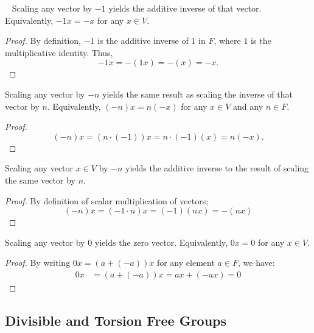 \begin{claim}~\label{claim:scale-neg-1}
  Scaling any vector by $-1$ yields the additive inverse of that vector.
  Equivalently, $-1 x = -x$ for any $x \in V$.

  \begin{proof}
    By definition, $-1$ is the additive inverse of $1$ in $F$,
    where $1$ is the multiplicative identity.
    Thus, \[ -1 x = -(1 x) = -(x) = -x. \]
  \end{proof}

  \begin{corollary}
    Scaling any vector by $-n$ yields the same result as scaling the inverse
    of that vector by $n$.
    Equivalently, $(-n) x = n (-x)$ for any $x \in V$ and any $n \in F$.

    \begin{proof}
      \[ (-n) x = (n \cdot (-1)) x = n \cdot (-1) (x) = n (-x). \]
    \end{proof}
  \end{corollary}

  \begin{corollary}
    Scaling any vector $x \in V$ by $-n$ yields the additive inverse to the result
    of scaling the same vector by $n$.

    \begin{proof}
      By definition of scalar multiplication of vectors;
      \[
        (-n) x = (-1 \cdot n) x = (-1) (n x) = - (nx)
      \]
    \end{proof}
  \end{corollary}

  \begin{corollary}
  Scaling any vector by $0$ yields the zero vector.
  Equivalently, $0x = 0$ for any $x \in V$.

  \begin{proof}
    By writing $0x = (a + (-a))x$ for any element $a \in F$, we have:
    \begin{align*}
      0x &= (a + (-a))x
        = ax + (-ax)
        = 0 
    \end{align*}
  \end{proof}
  \end{corollary}
\end{claim}

\newpage
\subsection{Divisible and Torsion Free Groups}~\label{sec:def-div-groups}

